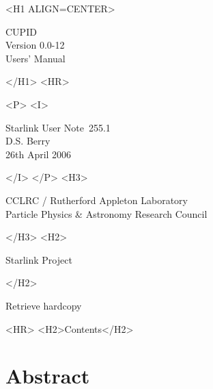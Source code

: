 \documentclass[twoside,11pt]{article}
\newcommand{\stardoccategory}  {Starlink User Note}
\newcommand{\stardocsource}    {sun\stardocnumber}
\newcommand{\stardocnumber}    {255.1}
\newcommand{\stardocauthors}   {D.S. Berry}
\newcommand{\stardocdate}      {26th April 2006}
\newcommand{\stardoctitle}     {CUPID}
\newcommand{\stardocversion}   {Version 0.0-12}
\newcommand{\stardocmanual}    {Users' Manual}
\newcommand{\htmladdnormallink}[2]{#1}
\newcommand{\htmladdimg}[1]{}
\newcommand{\htmlref}[2]{#1}
\newcommand{\htmladdtonavigation}[1]{}
\newcommand{\xlabel}[1]{}
\renewcommand{\_}{\texttt{\symbol{95}}}
\begin{document}
\begin{htmlonly}
   \xlabel{}
   \begin{rawhtml} <H1 ALIGN=CENTER> \end{rawhtml}
      \stardoctitle\\
      \stardocversion\\
      \stardocmanual
   \begin{rawhtml} </H1> <HR> \end{rawhtml}

   \begin{rawhtml} <P> <I> \end{rawhtml}
   \stardoccategory\ \stardocnumber \\
   \stardocauthors \\
   \stardocdate
   \begin{rawhtml} </I> </P> <H3> \end{rawhtml}
      \htmladdnormallink{CCLRC}{http://www.cclrc.ac.uk} /
      \htmladdnormallink{Rutherford Appleton Laboratory}
                        {http://www.cclrc.ac.uk/ral} \\
      \htmladdnormallink{Particle Physics \& Astronomy Research Council}
                        {http://www.pparc.ac.uk} \\
   \begin{rawhtml} </H3> <H2> \end{rawhtml}
      \htmladdnormallink{Starlink Project}{http://www.starlink.rl.ac.uk/}
   \begin{rawhtml} </H2> \end{rawhtml}
   \htmladdnormallink{\htmladdimg{source.gif} Retrieve hardcopy}
      {http://www.starlink.rl.ac.uk/cgi-bin/hcserver?\stardocsource}\\

  \label{stardoccontents}
  \begin{rawhtml} 
    <HR>
    <H2>Contents</H2>
  \end{rawhtml}
  \htmladdtonavigation{\htmlref{\htmladdimg{contents_motif.gif}}
        {stardoccontents}}

  \section{\xlabel{abstract}Abstract}
\end{htmlonly}
\end{document}
